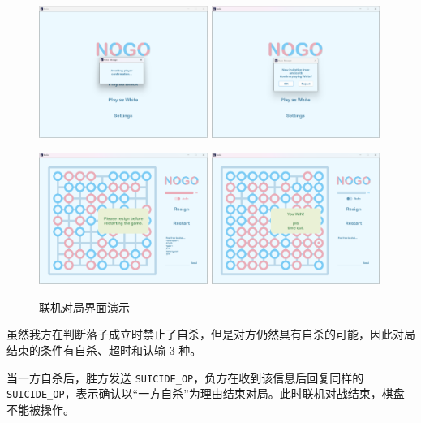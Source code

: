 \documentclass{noithesis}
\begin{document}
   \begin{figure}[!htb]
    	\centering
    	
    	\includegraphics[width=5.5cm]{img/web4.png}
    	\includegraphics[width=5.5cm]{img/web5.png}
    	
    	\includegraphics[width=5.5cm]{img/web2.png}
    	\includegraphics[width=5.5cm]{img/web3.png}
    	
    	\caption{联机对局界面演示}
    \end{figure}
    
    虽然我方在判断落子成立时禁止了自杀，但是对方仍然具有自杀的可能，因此对局结束的条件有自杀、超时和认输 $3$ 种。

	当一方自杀后，胜方发送 \verb|SUICIDE_OP|，负方在收到该信息后回复同样的 \verb|SUICIDE_OP|，表示确认以“一方自杀”为理由结束对局。此时联机对战结束，棋盘不能被操作。
	
\end{document}
